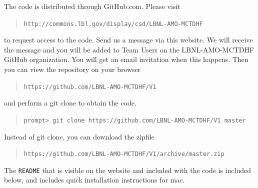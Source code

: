 \documentclass[10pt,leqno, oneside]{book}
\begin{document}
The code is distributed through GitHub.com.
Please visit 
\begin{quote}
    \verb#http://commons.lbl.gov/display/csd/LBNL-AMO-MCTDHF#
\end{quote}
to request access to the code.
Send us a message via this website.   We will receive the message and 
you will be added to Team Users on the LBNL-AMO-MCTDHF GitHub organization.  You will get an
email invitation when this happens.
%
Then you can view the repository on your browser
\begin{quote}
    \verb#https://github.com/LBNL-AMO-MCTDHF/V1#
\end{quote}
and perform a git clone to obtain the code.
\begin{quote} 
    \verb#prompt> git clone https://github.com/LBNL-AMO-MCTDHF/V1 master#
\end{quote}
%
Instead of git clone, you can download the zipfile
%
\begin{quote} 
    \verb#https://github.com/LBNL-AMO-MCTDHF/V1/archive/master.zip#
\end{quote}
The \verb#README# that is visible on the website and included with the code is included below, and includes quick installation
instructions for mac.



\end{document}
